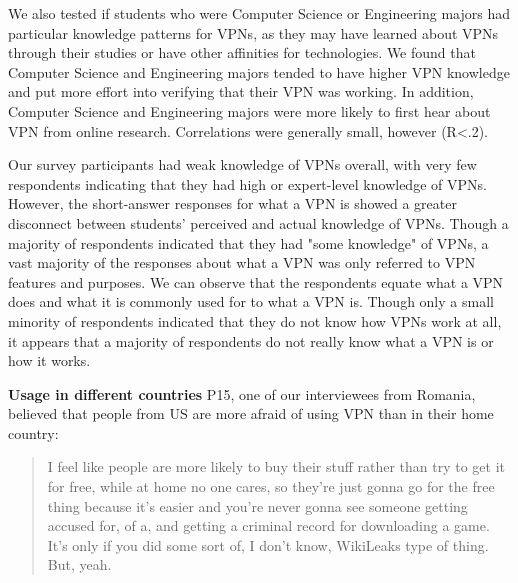 We also tested if students who were Computer Science or Engineering majors had
particular knowledge patterns for VPNs, as they may have learned about VPNs
through their studies or have other affinities for technologies. We found that
Computer Science and Engineering majors tended to have higher VPN knowledge
and put more effort into verifying that their VPN was working. In addition,
Computer Science and Engineering majors were more likely to first hear about
VPN from online research. Correlations were generally small, however (R<.2).

Our survey participants had weak knowledge of VPNs overall, with very few
respondents indicating that they had high or expert-level knowledge of VPNs.
However, the short-answer responses for what a VPN is showed a greater
disconnect between students’ perceived and actual knowledge of VPNs. Though a
majority of respondents indicated that they had "some knowledge" of VPNs, a
vast majority of the responses about what a VPN was only referred to VPN
features and purposes. We can observe that the respondents equate what a VPN
does and what it is commonly used for to what a VPN is. Though only a small
minority of respondents indicated that they do not know how VPNs work at all,
it appears that a majority of respondents do not really know what a VPN is or
how it works.

\textbf{Usage in different countries}
P15, one of our interviewees from Romania, believed that people from US are
more afraid of using VPN than in their home country: \begin{quote}I feel like
people are more likely to buy their stuff rather than try to get it for free,
while at home no one cares, so they're just gonna go for the free thing
because it's easier and you're never gonna see someone getting accused for, of
a, and getting a criminal record for downloading a game. It's only if you did
some sort of, I don't know, WikiLeaks type of thing. But, yeah.\end{quote}